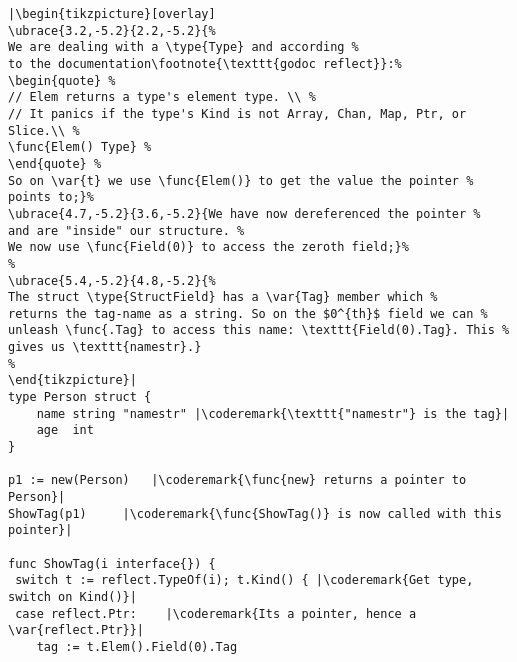 \begin{lstlisting}[caption=Introspection using reflection,label=src:introspection]
|\begin{tikzpicture}[overlay]
\ubrace{3.2,-5.2}{2.2,-5.2}{%
We are dealing with a \type{Type} and according %
to the documentation\footnote{\texttt{godoc reflect}}:%
\begin{quote} %
// Elem returns a type's element type. \\ %
// It panics if the type's Kind is not Array, Chan, Map, Ptr, or Slice.\\ %
\func{Elem() Type} %
\end{quote} %
So on \var{t} we use \func{Elem()} to get the value the pointer %
points to;}%
\ubrace{4.7,-5.2}{3.6,-5.2}{We have now dereferenced the pointer %
and are "inside" our structure. %
We now use \func{Field(0)} to access the zeroth field;}%
%
\ubrace{5.4,-5.2}{4.8,-5.2}{%
The struct \type{StructField} has a \var{Tag} member which %
returns the tag-name as a string. So on the $0^{th}$ field we can %
unleash \func{.Tag} to access this name: \texttt{Field(0).Tag}. This %
gives us \texttt{namestr}.}
%
\end{tikzpicture}|
type Person struct {
    name string "namestr" |\coderemark{\texttt{"namestr"} is the tag}|
    age  int
}

p1 := new(Person)   |\coderemark{\func{new} returns a pointer to Person}|
ShowTag(p1)	    |\coderemark{\func{ShowTag()} is now called with this pointer}|

func ShowTag(i interface{}) {
 switch t := reflect.TypeOf(i); t.Kind() { |\coderemark{Get type, switch on Kind()}|
 case reflect.Ptr:	  |\coderemark{Its a pointer, hence a \var{reflect.Ptr}}|
	tag := t.Elem().Field(0).Tag
\end{lstlisting}
